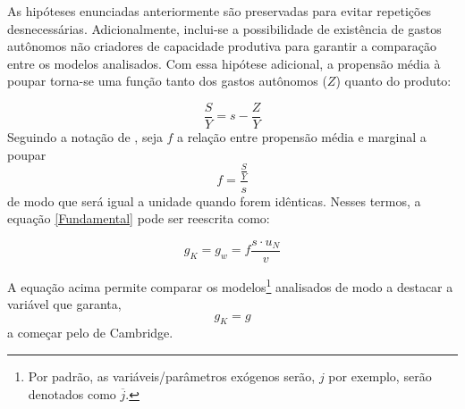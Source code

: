As hipóteses enunciadas anteriormente são preservadas para evitar repetições desnecessárias. Adicionalmente, inclui-se a possibilidade de existência de gastos autônomos não criadores de capacidade produtiva para garantir a comparação entre os modelos analisados. Com essa hipótese adicional, a propensão média à poupar torna-se uma função tanto dos gastos autônomos ($Z$) quanto do produto:

\begin{equation}
\label{Poupanca_Super}
    \frac{S}{Y} = s - \frac{Z}{Y}
\end{equation}
Seguindo a notação de \textcite{serrano_sraffian_1995}, seja $f$ a relação entre propensão média e marginal a poupar
$$
f = \frac{\frac{S}{Y}}{s}
$$
de modo que será igual a unidade quando forem idênticas. Nesses termos, a equação \ref{Fundamental} pode ser reescrita como:

\begin{equation}
 \label{EqGeral}   
g_K = g_w = f\frac{s\cdot u_N}{v}
\end{equation}

A equação acima permite comparar os modelos\footnote{Por padrão, as variáveis/parâmetros exógenos serão, $j$ por exemplo, serão denotados como $\overline j$.} analisados de modo a destacar a variável que garanta, 
$$
g_K = g
$$
a começar pelo de Cambridge.
